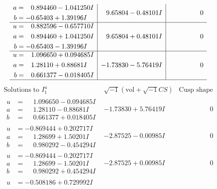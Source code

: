 \documentclass[1p]{elsarticle_modified}
\theoremstyle{definition}
\newcommand{\I}{\sqrt{-1}}
\begin{document}
$$\begin{array}{c|c|c}
\begin{aligned}
a &= \phantom{-}0.894460 - 1.041250 I \\
b &= -0.65403 + 1.39196 I\end{aligned}
 & \phantom{-}9.65804 - 0.48101 I & \phantom{-0.000000 } 0 \\ \hline\begin{aligned}
u &= \phantom{-}0.882596 - 0.657710 I \\
a &= \phantom{-}0.894460 + 1.041250 I \\
b &= -0.65403 - 1.39196 I\end{aligned}
 & \phantom{-}9.65804 + 0.48101 I & \phantom{-0.000000 } 0 \\ \hline\begin{aligned}
u &= \phantom{-}1.096650 + 0.094685 I \\
a &= \phantom{-}1.28110 + 0.88681 I \\
b &= \phantom{-}0.661377 - 0.018405 I\end{aligned}
 & -1.73830 - 5.76419 I & \phantom{-0.000000 } 0\\
 \hline 
 \end{array}$$\newpage$$\begin{array}{c|c|c}  
\text{Solutions to }I^u_{1}& \I (\text{vol} + \sqrt{-1}CS) & \text{Cusp shape}\\
 \hline 
\begin{aligned}
u &= \phantom{-}1.096650 - 0.094685 I \\
a &= \phantom{-}1.28110 - 0.88681 I \\
b &= \phantom{-}0.661377 + 0.018405 I\end{aligned}
 & -1.73830 + 5.76419 I & \phantom{-0.000000 } 0 \\ \hline\begin{aligned}
u &= -0.869444 + 0.202717 I \\
a &= \phantom{-}1.28699 + 1.50201 I \\
b &= \phantom{-}0.980292 - 0.454294 I\end{aligned}
 & -2.87525 - 0.00985 I & \phantom{-0.000000 } 0 \\ \hline\begin{aligned}
u &= -0.869444 - 0.202717 I \\
a &= \phantom{-}1.28699 - 1.50201 I \\
b &= \phantom{-}0.980292 + 0.454294 I\end{aligned}
 & -2.87525 + 0.00985 I & \phantom{-0.000000 } 0 \\ \hline\begin{aligned}
u &= -0.508186 + 0.729992 I \\

\end{aligned}
\end{array}$$
\end{document}
